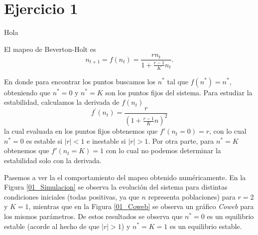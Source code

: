 \section*{Ejercicio 1}
\graphicspath{{Figuras/ej_01/}}

Hola \cite{einstein}

El mapeo de Beverton-Holt es
\begin{equation}
    n_{t+1} = f(n_{t}) = \frac{rn_{t}}{1+\frac{r-1}{K}n_{t}}.
\end{equation}

En donde para encontrar los puntos buscamos los $n^{*}$ tal que $f(n^{*}) = n^{*}$, obteniendo que $n^{*} = 0$ y $n^{*} = K$ son los puntos fijos del sistema. Para estudiar la estabilidad, calculamos la derivada de $f(n_{t})$
\begin{equation}
    f^{'}(n_{t}) = \frac{r}{(1+\frac{r-1}{K}n)^{2}}
    \label{eq:Mapeo_Beverton-Holt}
\end{equation}
la cual evaluada en los puntos fijos obtenemos que $f'(n_{t}=0) = r$, con lo cual $n^{*}=0$ es estable si $|r|<1$ e inestable si $|r|>1$. Por otra parte, para $n^{*}=K$ obtenemos que $f'(n_{t}=K)=1$ con lo cual no podemos determinar la estabilidad solo con la derivada.

Pasemos a ver la el comportamiento del mapeo obtenido numéricamente. En la Figura \ref{01_Simulacion} se observa la evolución del sistema para distintas condiciones iniciales (todas positivas, ya que $n$ representa poblaciones) para $r=2$ y $K=1$, mientras que en la Figura \ref{01_Coweb} se observa un gráfico \textit{Coweb} para los mismos parámetros. De estos resultados se observa que $n^{*}=0$ es un equilibrio estable (acorde al hecho de que $|r|>1$) y $n^{*}=K=1$ es un equilibrio estable.

